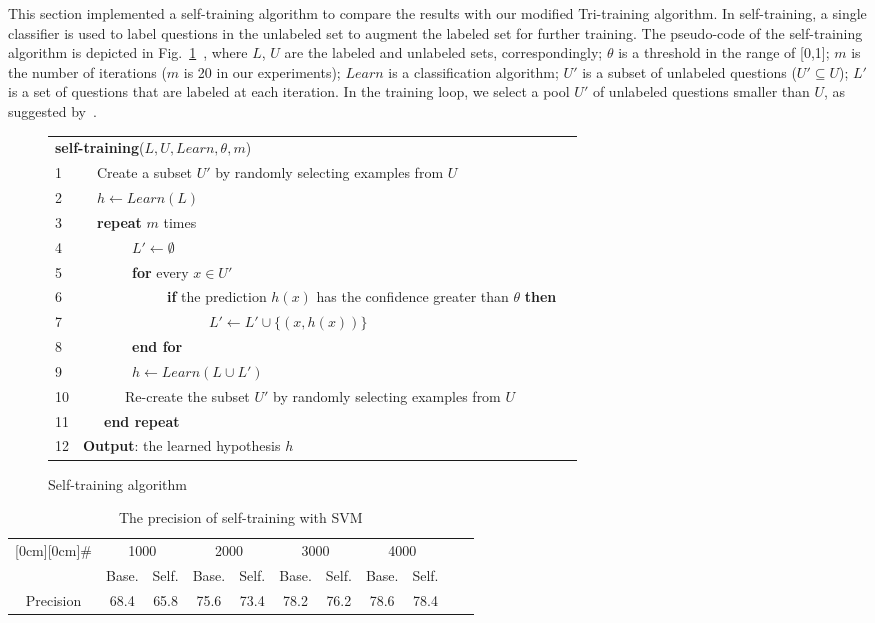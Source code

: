 \documentclass[english]{jnlp_1.4}
\begin{document}
This section implemented a self-training algorithm to compare the
results with our modified Tri-training algorithm. In
self-training, a single classifier is used to label questions in
the unlabeled set to augment the labeled set for further training.
The pseudo-code of the self-training algorithm is depicted in
Fig.~\ref{selftrainingalg}~\cite{Nigam2000}, where $L$, $U$ are
the labeled and unlabeled sets, correspondingly; $\theta$ is a
threshold in the range of [0,1]; $m$ is the number of iterations
($m$ is 20 in our experiments); $Learn$ is a classification
algorithm; $U'$ is a subset of unlabeled questions ($U'\subseteq
U$); $L'$ is a set of questions that are labeled at each
iteration. In the training loop, we select a pool $U'$ of
unlabeled questions smaller than $U$, as suggested
by~\cite{Blum98}.

\begin{figure}[t]
\centering
\begin{tabular}{|l|l|}
\hline
\textbf{self-training}($L,U,Learn,\theta,m$) \\
1\ \ \ \ \ Create a subset $U'$ by randomly selecting examples from $U$ \\
2\ \ \ \ \ $h\leftarrow Learn(L)$ \\
3\ \ \ \ \ \textbf{repeat} $m$ times \\
4\ \ \ \ \ \ \ \ \ \ $L' \leftarrow \emptyset$ \\
5\ \ \ \ \ \ \ \ \ \ \textbf{for} every $x\in U'$  \\
6\ \ \ \ \ \ \ \ \ \ \ \ \ \ \ \textbf{if} the prediction $h(x)$ has the confidence greater than $\theta$ \textbf{then} \\
7\ \ \ \ \ \ \ \ \ \ \ \ \ \ \ \ \ \ \ \ \ $L' \leftarrow L'\cup \{(x,h(x))\}$ \\
8\ \ \ \ \ \ \ \ \ \ \textbf{end for} \\
9\ \ \ \ \ \ \ \ \ \ $h \leftarrow Learn(L\cup L')$ \\
10\ \ \ \ \ \ \ \ Re-create the subset $U'$ by randomly selecting examples from $U$ \\
11\ \ \ \ \ \textbf{end repeat} \\
12\ \ \textbf{Output}: the learned hypothesis $h$ \\
\hline
\end{tabular}
\caption{Self-training algorithm} \label{selftrainingalg}
\end{figure}

\begin{table}[t]
\centering
\caption{The precision of self-training with SVM}
\label{selftrainingresult}
\begin{tabular}{|c||c|c||c|c||c|c||c|c||c|c||}
\hline
\raisebox{-1.50ex}[0cm][0cm]{\#} & \multicolumn{2}{|c|}{1000} & \multicolumn{2}{|c|}{2000} & \multicolumn{2}{|c|}{3000} & \multicolumn{2}{|c|}{4000} \\
\cline{2-9}
 & Base. & Self. & Base. & Self. & Base. & Self. & Base. & Self. \\
 \hline
Precision & 68.4 & 65.8 & 75.6 & 73.4 & 78.2 & 76.2 & 78.6 & 78.4 \\
 \hline
\end{tabular}
\end{table}
\end{document}
